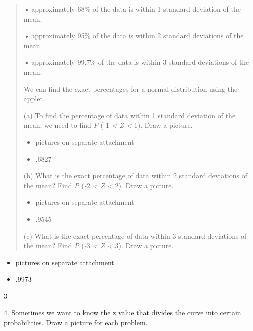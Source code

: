 \documentclass{article}
\begin{document}
\begin{quote}
\emph{•} approximately 68\% of the data is within 1 standard deviation
of the mean.

\emph{•} approximately 95\% of the data is within 2 standard deviations
of the mean.

\emph{•} approximately 99.7\% of the data is within 3 standard
deviations of the mean.

We can find the exact percentages for a normal distribution using the
applet.

(a) To find the percentage of data within 1 standard deviation of the
mean, we need to find \emph{P} (\emph{-}1 \emph{\textless{} Z \textless{}}
1). Draw a picture.
\begin{itemize}
    \item pictures on separate attachment
    \item .6827
\end{itemize}
(b) What is the exact percentage of data within 2 standard deviations of
the mean? Find \emph{P} (\emph{-}2 \emph{\textless{} Z \textless{}} 2).
Draw a picture.
\begin{itemize}
    \item pictures on separate attachment
    \item .9545
\end{itemize}
(c) What is the exact percentage of data within 3 standard deviations of
the mean? Find \emph{P} (\emph{-}3 \emph{\textless{} Z \textless{}} 3).
Draw a picture.
\end{quote}
\begin{itemize}
    \item pictures on separate attachment
    \item .9973
\end{itemize}
3

4. Sometimes we want to know the z value that divides the curve into
certain probabilities. Draw a picture for each problem.
\end{document}
